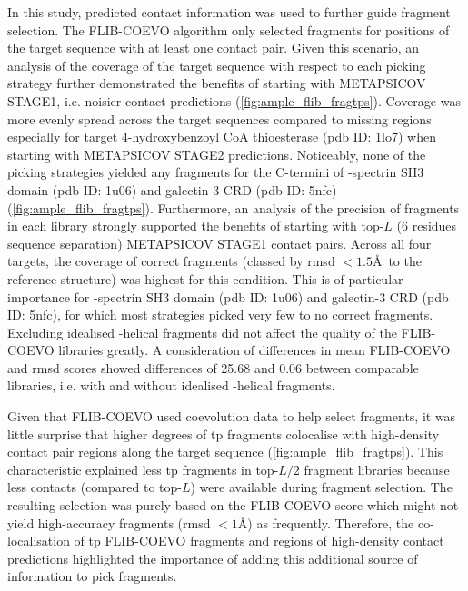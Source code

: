 In this study, predicted contact information was used to further guide fragment selection. The FLIB-COEVO algorithm only selected fragments for positions of the target sequence with at least one contact pair. Given this scenario, an analysis of the coverage of the target sequence with respect to each picking strategy further demonstrated the benefits of starting with METAPSICOV STAGE1, i.e. noisier contact predictions (\cref{fig:ample_flib_fragtps}). Coverage was more evenly spread across the target sequences compared to missing regions especially for target 4-hydroxybenzoyl CoA thioesterase (\gls{pdb} ID: 1lo7) when starting with METAPSICOV STAGE2 predictions. Noticeably, none of the picking strategies yielded any fragments for the C-termini of \textalpha-spectrin SH3 domain (\gls{pdb} ID: 1u06) and galectin-3 CRD (\gls{pdb} ID: 5nfc) (\cref{fig:ample_flib_fragtps}). Furthermore, an analysis of the precision of fragments in each library strongly supported the benefits of starting with top-$L$ (6 residues sequence separation) METAPSICOV STAGE1 contact pairs. Across all four targets, the coverage of correct fragments (classed by \gls{rmsd} $<1.5$\AA\ to the reference structure) was highest for this condition. This is of particular importance for \textalpha-spectrin SH3 domain (\gls{pdb} ID: 1u06) and galectin-3 CRD (\gls{pdb} ID: 5nfc), for which most strategies picked very few to no correct fragments. Excluding idealised \textalpha-helical fragments did not affect the quality of the FLIB-COEVO libraries greatly. A consideration of differences in mean FLIB-COEVO and \gls{rmsd} scores showed differences of 25.68 and 0.06 between comparable libraries, i.e. with and without idealised \textalpha-helical fragments.

Given that FLIB-COEVO used coevolution data to help select fragments, it was little surprise that higher degrees of \gls{tp} fragments colocalise with high-density contact pair regions along the target sequence (\cref{fig:ample_flib_fragtps}). This characteristic explained less \gls{tp} fragments in top-$L/2$ fragment libraries because less contacts (compared to top-$L$) were available during fragment selection. The resulting selection was purely based on the FLIB-COEVO score which might not yield high-accuracy fragments (\gls{rmsd} $<1$\AA) as frequently. Therefore, the co-localisation of \gls{tp} FLIB-COEVO fragments and regions of high-density contact predictions highlighted the importance of adding this additional source of information to pick fragments. 

